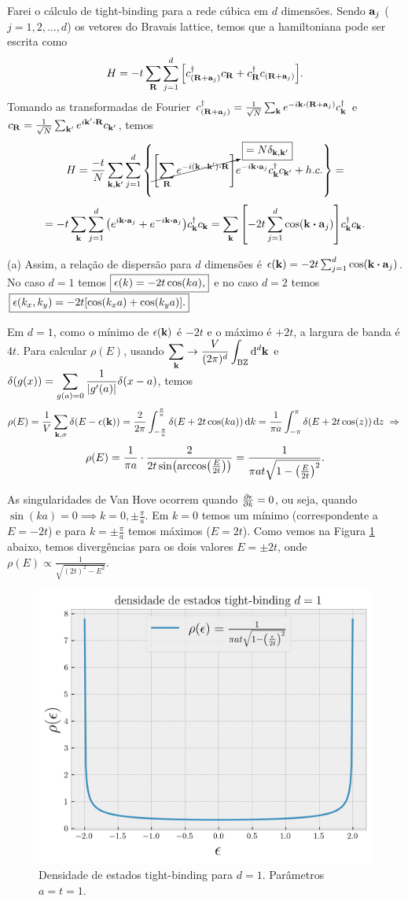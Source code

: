 \documentclass[a4paper,10pt]{article}
\begin{document}
Farei o cálculo de tight-binding para a rede cúbica em $d$ dimensões. Sendo $\vb{a}_j$ ($j=1,2,\ldots,d$) os vetores do Bravais lattice, temos que a hamiltoniana pode ser escrita como
$$
H = -t \sum_{\vb{R}} \sum_{j=1}^{d}
\qty[ c_{(\vb{R}+\vb{a}_j)}^\dagger c_{\vb{R}} + c_{\vb{R}}^\dagger c_{(\vb{R}+\vb{a}_j)} ].
$$
Tomando as transformadas de Fourier $c_{(\R+\a_j)}^\d = \frac{1}{\sqrt{N}} \sum_{\k} e^{-i\k\vdot(\R+\a_j)} c_{\k}^\d$ e $c_{\R} = \frac{1}{\sqrt{N}} \sum_{\k'} e^{i\k'\vdot\R} c_{\k'}$, temos
$$
H = \frac{-t}{N} \sum_{\k,\k'} \sum_{j=1}^{d}
\qty{
\cancelto{\boxed{= N \delta_{\k, \k'}}}{\qty[\sum_{\R} e^{-i(\k-\k')\vdot\R}]}
e^{-i\k\vdot\a_j} c_{\k}^\d c_{\k'} + h.c.} =
$$
$$
= -t \sum_{\k} \sum_{j=1}^{d} \qty(e^{i\k\vdot\a_j} + e^{-i\k\vdot\a_j})
c_{\k}^\d c_{\k} =
\sum_{\k} \qty[- 2t \sum_{j=1}^{d} \cos(\k \vdot \a_j)] c_{\k}^\d c_{\k}.
$$

(a) Assim, a relação de dispersão para $d$ dimensões é $\eps(\k) = -2t \sum_{j=1}^{d} \cos(\k \vdot \a_j)$. No caso $d=1$ temos $\boxed{\epsilon(k) = -2t \cos(ka),}$ e no caso $d = 2$ temos $\boxed{\epsilon(k_x, k_y) = -2t [\cos(k_x a) + \cos(k_y a) ].}$

\n

Em $d = 1$, como o mínimo de $\epsilon(\vb{k})$ é $-2t$ e o máximo é $+2t$, a largura de banda é $4t$. Para calcular $\rho(E)$, usando $\displaystyle{\sum_{\vb{k}} \to \frac{V}{(2\pi)^d} \int_{\text{BZ}} \dd[d]{\vb{k}}}$ e $\displaystyle{\delta(g(x)) = \sum_{g(a)=0} \frac{1}{\abs{g'(a)}} \delta(x-a)}$, temos
$$
\rho(E) = \frac{1}{V} \sum_{\vb{k}, \sigma} \delta(E - \epsilon(\vb{k})) =
\frac{2}{2\pi} \int_{-\frac{\pi}{a}}^{\frac{\pi}{a}} \delta(E + 2t \cos(ka)) \dd{k} =
\frac{1}{\pi a} \int_{-\pi}^{\pi} \delta(E + 2t \cos(z)) \dd{z} \; \Rightarrow \;
$$
$$
\rho(E) = \frac{1}{\pi a} \cdot \frac{2}{2t \sin(\arccos(\frac{E}{2t}))} =
\frac{1}{\pi a t \sqrt{1 - \qty(\frac{E}{2t})^2}}.
$$

As singularidades de Van Hove ocorrem quando $\pdv{\epsilon}{k} = 0$, ou seja, quando $\sin(ka) = 0 \implies k = 0, \pm\frac{\pi}{a}$. Em $k = 0$ temos um mínimo (correspondente a $E = -2t$) e para $k = \pm \frac{\pi}{a}$ temos máximos ($E = 2t$). Como vemos na Figura \ref{fig:tightbinding-d1} abaixo, temos divergências para os dois valores $E = \pm 2t$, onde $\rho(E) \propto \frac{1}{\sqrt{(2t)^2 - E^2}}$.

\begin{figure}[H]
\centering
\includegraphics[width=0.6\linewidth]{fig/dos-tightbinding-d1.png}
\caption{Densidade de estados tight-binding para $d=1$. Parâmetros $a = t =1$.}
\label{fig:tightbinding-d1}
\end{figure}
\end{document}
